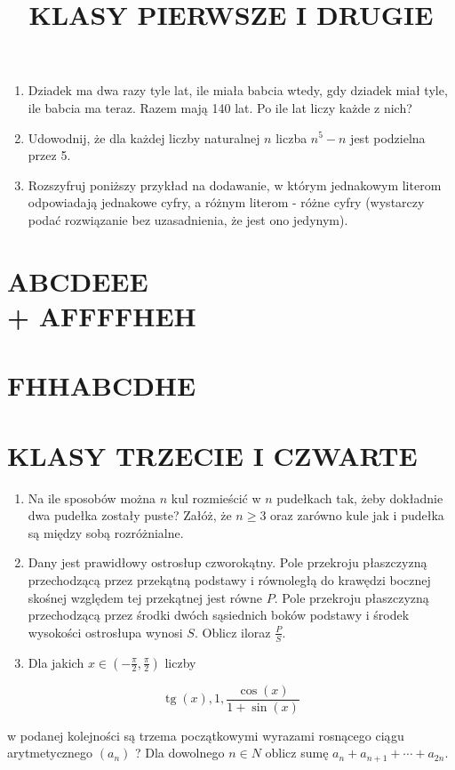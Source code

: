 \documentclass[10pt]{article}
\title{KLASY PIERWSZE I DRUGIE }
\author{}
\date{}
\begin{document}
\maketitle
\begin{enumerate}
  \item Dziadek ma dwa razy tyle lat, ile miała babcia wtedy, gdy dziadek miał tyle, ile babcia ma teraz. Razem mają 140 lat. Po ile lat liczy każde z nich?
  \item Udowodnij, że dla każdej liczby naturalnej \(n\) liczba \(n^{5}-n\) jest podzielna przez 5.
  \item Rozszyfruj poniższy przykład na dodawanie, w którym jednakowym literom odpowiadają jednakowe cyfry, a różnym literom - różne cyfry (wystarczy podać rozwiązanie bez uzasadnienia, że jest ono jedynym).
\end{enumerate}

\section*{ABCDEEE \\
 + AFFFFHEH}
\section*{FHHABCDHE}
\section*{KLASY TRZECIE I CZWARTE}
\begin{enumerate}
  \item Na ile sposobów można \(n\) kul rozmieścić w \(n\) pudełkach tak, żeby dokładnie dwa pudełka zostały puste? Załóż, że \(n \geq 3\) oraz zarówno kule jak i pudełka są między sobą rozróżnialne.
  \item Dany jest prawidłowy ostrosłup czworokątny. Pole przekroju płaszczyzną przechodzącą przez przekątną podstawy i równoległą do krawędzi bocznej skośnej względem tej przekątnej jest równe \(P\). Pole przekroju płaszczyzną przechodzącą przez środki dwóch sąsiednich boków podstawy i środek wysokości ostrosłupa wynosi \(S\). Oblicz iloraz \(\frac{P}{S}\).
  \item Dla jakich \(x \in\left(-\frac{\pi}{2}, \frac{\pi}{2}\right)\) liczby
\end{enumerate}

\[
\operatorname{tg}(x), 1, \frac{\cos (x)}{1+\sin (x)}
\]

w podanej kolejności są trzema początkowymi wyrazami rosnącego ciągu arytmetycznego \(\left(a_{n}\right)\) ? Dla dowolnego \(n \in N\) oblicz sumę \(a_{n}+a_{n+1}+\cdots+a_{2 n}\).
\end{document}
